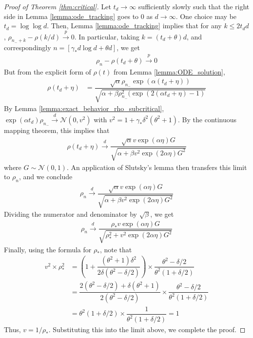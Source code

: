 \documentclass[12pt]{article}
\def\gN{{\mathcal{N}}}
\begin{document}
\begin{proof}[Proof of Theorem \ref{thm:critical}]
        Let $t_d\to\infty$ sufficiently slowly such that the right side in Lemma \ref{lemma:ode_tracking} goes to $0$ as $d\to\infty$. One choice may be $t_d=\log\log d$. Then, Lemma \ref{lemma:ode_tracking} implies that for any $k\leq 2t_d d$, $\rho_{n_-+k}-\rho(k/d)\stackrel{p}{\to}0$. In particular, taking $k=(t_d+\theta)d$, and correspondingly $n=[\gamma_*d\log d + \theta d]$, we get
    \begin{align*}
        \rho_n -\rho(t_d+\theta)\stackrel{p}{\to}0
    \end{align*}But from the explicit form of $\rho(t)$ from Lemma \ref{lemma:ODE_solution},
    \begin{align*}
        \rho(t_d+\eta) &= \dfrac{\sqrt{\alpha}\rho_{n_-}\exp(\alpha (t_d+\eta))}{\sqrt{\alpha + \beta\rho^2_{n_-}(\exp(2(\alpha t_d+ \eta)-1)}}
    \end{align*}By Lemma \ref{lemma:exact_behavior_rho_subcritical}, $\exp(\alpha t_d)\rho_{n_-}\stackrel{d}{\to}\gN(0, v^2)$ with $v^2=1+\gamma_*\delta^2(\theta^2+1)$. By the continuous mapping theorem, this implies that
    \begin{align*}
        \rho(t_d+\eta) \stackrel{d}{\to}\dfrac{\sqrt{\alpha}v\exp(\alpha\eta)G}{\sqrt{\alpha + \beta v^2 \exp(2\alpha\eta) G^2}}
    \end{align*}where $G\sim\gN(0,1)$. An application of Slutsky's lemma then transfers this limit to $\rho_n$, and we conclude
    \begin{align*}
        \rho_n \stackrel{d}{\to}\dfrac{\sqrt{\alpha}v\exp(\alpha\eta)G}{\sqrt{\alpha + \beta v^2 \exp(2\alpha\eta) G^2}}
    \end{align*}Dividing the numerator and denominator by $\sqrt{\beta}$, we get
    \begin{align*}
        \rho_n \stackrel{d}{\to}\dfrac{\rho_*v\exp(\alpha\eta)G}{\sqrt{\rho_*^2 + v^2 \exp(2\alpha\eta) G^2}}
    \end{align*}Finally, using the formula for $\rho_*$, note that
    \begin{align*}
        v^2\times \rho_*^2 &= \left(1 + \dfrac{(\theta^2+1)\delta^2}{2\delta(\theta^2-\delta/2)}\right)\times \dfrac{\theta^2-\delta/2}{\theta^2(1+\delta/2)}\\
        &= \dfrac{2(\theta^2-\delta/2)+\delta(\theta^2+1)}{2(\theta^2-\delta/2)}\times \dfrac{\theta^2-\delta/2}{\theta^2(1+\delta/2)}\\
        &=\theta^2(1 + \delta/2)\times\dfrac{1}{\theta^2(1+\delta/2)} = 1
    \end{align*}Thus, $v=1/\rho_*$. Substituting this into the limit above, we complete the proof.
\end{proof}
\end{document}
